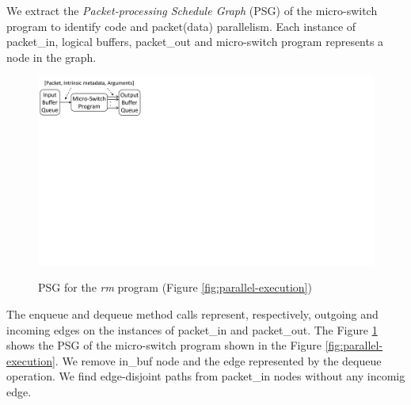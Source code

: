 We extract the \emph{Packet-processing Schedule Graph} (PSG) of the micro-switch program to identify code and packet(data) parallelism.
Each instance of packet\_in, logical buffers, packet\-\_out and micro-switch program represents a node in the graph.
\begin{figure}[!h]
    \centering
    \includegraphics[trim=0 420 667 0, clip, scale=0.5]{microp4-program-model}
    \label{fig:graph}
    \caption{PSG for the \emph{rm} program (Figure \ref{fig:parallel-execution})}
\end{figure}
The enqueue and dequeue method calls represent, respectively, outgoing and incoming edges on the instances of packet\_in and packet\_out.
The Figure \ref{fig:graph} shows the PSG of the micro-switch program shown in the Figure \ref{fig:parallel-execution}.
We remove in\_buf node and the edge represented by the dequeue operation.
We find edge-disjoint paths from packet\_in nodes without any incomig edge.











